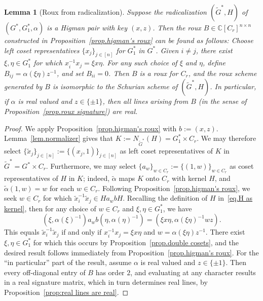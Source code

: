 \documentclass[11pt]{article}
\newtheorem{lemma}[theo]{Lemma}
\theoremstyle{definition}
\numberwithin{equation}{section}
\begin{document}
\begin{lemma}[Roux from radicalization]
\label{lem.radicalization's roux}
Suppose the radicalization $(\tilde{G}^*,H)$ of $(G^*,G_1^*,\alpha)$ is a Higman pair with key $(x,z)$.
Then the roux $B\in\mathbb{C}[C_r]^{n\times n}$ constructed in Proposition~\ref{prop.higman's roux} can be found as follows:
Choose left coset representatives $\{x_j\}_{j\in[n]}$ for $G_1^*$ in $G^*$.
Given $i\neq j$, there exist $\xi,\eta\in G_1^*$ for which $x_i^{-1}x_j=\xi x\eta$.
For any such choice of $\xi$ and $\eta$, define $B_{ij}=\alpha(\xi\eta)z^{-1}$, and set $B_{ii}=0$.
Then $B$ is a roux for $C_r$, and the roux scheme generated by $B$ is isomorphic to the Schurian scheme of $(\tilde{G}^*,H)$.
In particular, if $\alpha$ is real valued and $z\in\{\pm1\}$, then all lines arising from $B$ (in the sense of Proposition~\ref{prop.roux signature}) are real.
\end{lemma}

\begin{proof}
We apply Proposition~\ref{prop.higman's roux} with $b:=(x,z)$.
Lemma~\ref{lem.normalizer} gives that $K:=N_{\tilde{G}^*}(H) = G_1^* \times C_r$.
We may therefore select $\{\tilde{x}_j \}_{j\in [n]} := 
\{ (x_j,1) \}_{j \in [n]}$ as left coset representatives of $K$ in $\tilde{G}^* = G^* \times C_r$.
Furthermore, we may select $\{ a_w \}_{w \in C_r} := \{ (1,w) \}_{w \in C_r}$ as coset representatives of $H$ in $K$; indeed, $\tilde{\alpha}$ maps $K$ onto $C_r$ with kernel $H$, and $\tilde{\alpha}(1,w) = w$ for each $w \in C_r$.
Following Proposition~\ref{prop.higman's roux}, we seek $w \in C_r$ for which $\tilde{x}_i^{-1} \tilde{x}_j \in H a_w b H$.
Recalling the definition of $H$ in~\eqref{eq.H as kernel}, then for any choice of $w \in C_r$ and $\xi,\eta \in G_1^*$, we have
\[
(\xi,\alpha(\xi)^{-1}) a_w b (\eta, \alpha(\eta)^{-1})
= (\xi x \eta, \alpha(\xi \eta)^{-1} w z).
\]
This equals $\tilde{x}_i^{-1} \tilde{x}_j$ if and only if $x_i^{-1} x_j = \xi x \eta$ and $w = \alpha(\xi \eta) z^{-1}$.
There exist $\xi,\eta \in G_1^*$ for which this occurs by Proposition~\ref{prop.double cosets}, and the desired result follows immediately from Proposition~\ref{prop.higman's roux}.
For the ``in particular'' part of the result, assume $\alpha$ is real valued and $z\in\{\pm1\}$.
Then every off-diagonal entry of $B$ has order $2$, and evaluating at any character results in a real signature matrix, which in turn determines real lines, by Proposition~\ref{prop:real lines are real}.
\end{proof}
\end{document}
